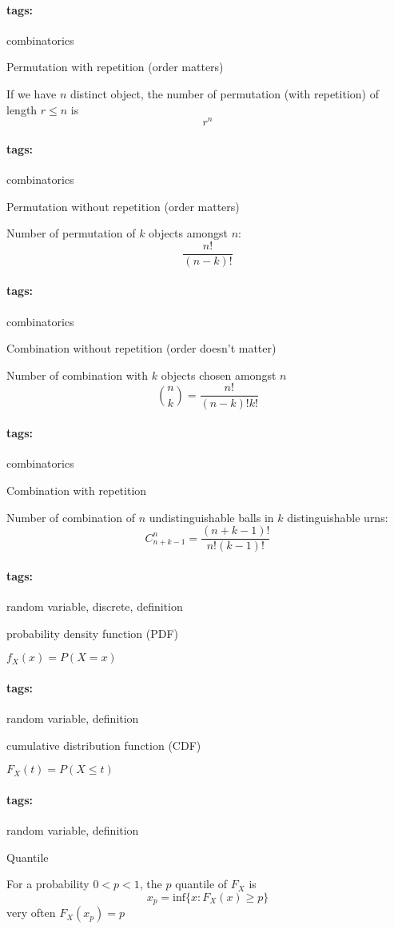 \documentclass[12pt]{article}
\newcommand*{\xfield}[1]{\begin{mdframed}\centering #1\end{mdframed}\bigskip}
\newenvironment{note}{}{}
\newcommand*{\tags}[1]{\paragraph{tags: }#1}
\begin{document}
\begin{note}
	\tags{combinatorics}
	\xfield{Permutation with repetition (order matters)} %
	\xfield{If we have $n$ distinct object, the number of permutation (with
    repetition) of length $r \le n$ is $$r^n$$} %
\end{note}

\begin{note}
	\tags{combinatorics}
	\xfield{Permutation without repetition (order matters)} %
	\xfield{Number of permutation of $k$ objects amongst $n$:
$$\frac{n!}{(n-k)!}$$} %
\end{note}

\begin{note}
	\tags{combinatorics}
	\xfield{Combination without repetition (order doesn't matter)} %
	\xfield{Number of combination with $k$ objects chosen amongst $n$
$$\binom{n}{k} = \frac{n!}{(n-k)!k!}$$} %
\end{note}

\begin{note}
	\tags{combinatorics}
	\xfield{Combination with repetition} %
	\xfield{Number of combination of $n$ undistinguishable balls in $k$
    distinguishable urns:
$$C^{n}_{n+k-1} = \frac{(n+k-1)!}{n!(k-1)!}$$} %
\end{note}

\begin{note}
	\tags{random variable, discrete, definition}
	\xfield{probability density function (PDF)} %
	\xfield{$f_X(x)=P(X=x)$} %
\end{note}

\begin{note}
	\tags{random variable, definition}
	\xfield{cumulative distribution function (CDF)} %
	\xfield{$F_X(t)=P(X \le t)$} %
\end{note}

\begin{note}
	\tags{random variable, definition}
	\xfield{Quantile} %
	\xfield{For a probability $0<p<1$, the $p$ quantile of $F_X$ is 
$$x_p = \text{inf}\lbrace x: F_X(x) \ge p \rbrace$$
very often $F_X(x_p) = p$} %
\end{note}
\end{document}
